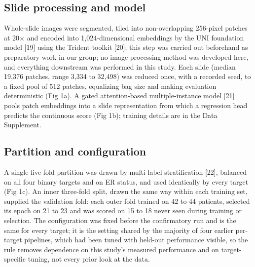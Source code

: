 \documentclass[11pt,a4paper]{article}
\begin{document}
\subsection{Slide processing and model}
Whole-slide images were segmented, tiled into non-overlapping 256-pixel patches at 20$\times$ and encoded into 1,024-dimensional embeddings by the UNI foundation model [19] using the Trident toolkit [20]; this step was carried out beforehand as preparatory work in our group; no image processing method was developed here, and everything downstream was performed in this study. Each slide (median 19,376 patches, range 3,334 to 32,498) was reduced once, with a recorded seed, to a fixed pool of 512 patches, equalizing bag size and making evaluation deterministic (Fig 1a). A gated attention-based multiple-instance model [21] pools patch embeddings into a slide representation from which a regression head predicts the continuous score (Fig 1b); training details are in the Data Supplement.

\subsection{Partition and configuration}
A single five-fold partition was drawn by multi-label stratification [22], balanced on all four binary targets and on ER status, and used identically by every target (Fig 1c). An inner three-fold split, drawn the same way within each training set, supplied the validation fold: each outer fold trained on 42 to 44 patients, selected its epoch on 21 to 23 and was scored on 15 to 18 never seen during training or selection. The configuration was fixed before the confirmatory run and is the same for every target; it is the setting shared by the majority of four earlier per-target pipelines, which had been tuned with held-out performance visible, so the rule removes dependence on this study's measured performance and on target-specific tuning, not every prior look at the data.
\end{document}
